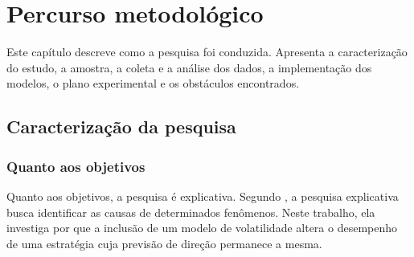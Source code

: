 \chapter{Percurso metodológico}

Este capítulo descreve como a pesquisa foi conduzida. Apresenta a caracterização
do estudo, a amostra, a coleta e a análise dos dados, a implementação dos
modelos, o plano experimental e os obstáculos encontrados.

\section{Caracterização da pesquisa}


\subsection{Quanto aos objetivos}

Quanto aos objetivos, a pesquisa é explicativa. Segundo ,
a pesquisa explicativa busca identificar as causas de determinados fenômenos.
Neste trabalho, ela investiga por que a inclusão de um modelo de volatilidade
altera o desempenho de uma estratégia cuja previsão de direção permanece a mesma.

